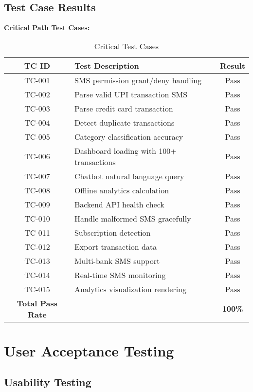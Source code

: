 \documentclass[11pt,a4paper]{report}
\begin{document}
\begin{itemize}
\begin{itemize}
\subsection{Test Case Results}

\textbf{Critical Path Test Cases:}

\begin{table}[H]
\centering
\caption{Critical Test Cases}
\begin{tabular}{|c|p{5cm}|c|}
\hline
\textbf{TC ID} & \textbf{Test Description} & \textbf{Result} \\
\hline
TC-001 & SMS permission grant/deny handling & Pass \\
TC-002 & Parse valid UPI transaction SMS & Pass \\
TC-003 & Parse credit card transaction & Pass \\
TC-004 & Detect duplicate transactions & Pass \\
TC-005 & Category classification accuracy & Pass \\
TC-006 & Dashboard loading with 100+ transactions & Pass \\
TC-007 & Chatbot natural language query & Pass \\
TC-008 & Offline analytics calculation & Pass \\
TC-009 & Backend API health check & Pass \\
TC-010 & Handle malformed SMS gracefully & Pass \\
TC-011 & Subscription detection & Pass \\
TC-012 & Export transaction data & Pass \\
TC-013 & Multi-bank SMS support & Pass \\
TC-014 & Real-time SMS monitoring & Pass \\
TC-015 & Analytics visualization rendering & Pass \\
\hline
\textbf{Total Pass Rate} & & \textbf{100\%} \\
\hline
\end{tabular}
\end{table}

\section{User Acceptance Testing}

\subsection{Usability Testing}


\end{itemize}
\end{itemize}
\end{document}
